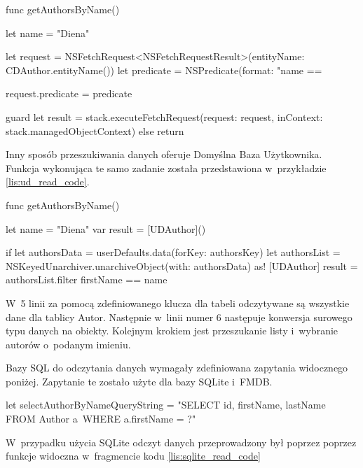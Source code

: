 \begin{code}[
		language=swift,
		caption={Przykład odczytu danych Core Data},
		label={lis:core_data_read_code},
	]
    func getAuthorsByName() {
        let name = "Diena"
        
        let request = NSFetchRequest<NSFetchRequestResult>(entityName: CDAuthor.entityName())
        let predicate = NSPredicate(format: "name == %
        
        request.predicate = predicate
        
        guard let result = stack.executeFetchRequest(request: request, inContext: stack.managedObjectContext) else { return }
    }
\end{code}
\bigskip

Inny sposób przeszukiwania danych oferuje Domyślna Baza Użytkownika. Funkcja wykonująca te samo zadanie została przedstawiona w~przykładzie \ref{lis:ud_read_code}.

\begin{code}[
		language=swift,
		caption={Przykład odczytu danych User Defaults},
		label={lis:ud_read_code},
	]
    func getAuthorsByName() {
        let name = "Diena"
        var result = [UDAuthor]()
        
        if  let authorsData = userDefaults.data(forKey: authorsKey) {
            let authorsList = NSKeyedUnarchiver.unarchiveObject(with: authorsData) as! [UDAuthor]
            result = authorsList.filter { firstName == name }
        }
    }
\end{code}
\bigskip

 W~5 linii za pomocą zdefiniowanego klucza dla tabeli odczytywane są wszystkie dane dla tablicy Autor. Następnie w~linii numer 6 następuje konwersja surowego typu danych na obiekty. Kolejnym krokiem jest przeszukanie listy i~wybranie autorów o~podanym imieniu. 

Bazy SQL do odczytania danych wymagały zdefiniowana zapytania widocznego poniżej. Zapytanie te zostało użyte dla bazy SQLite i~FMDB.

\begin{code}[
		language=swift,
		caption={Zapytanie SQL do odczytu danych},
		label={lis:sql_read_query_code},
	]
let selectAuthorByNameQueryString = "SELECT id, firstName, lastName FROM Author a~WHERE a.firstName = ?"
\end{code}
\bigskip

 W~przypadku użycia SQLite odczyt danych przeprowadzony był poprzez poprzez funkcje widoczna w~fragmencie kodu \ref{lis:sqlite_read_code}

